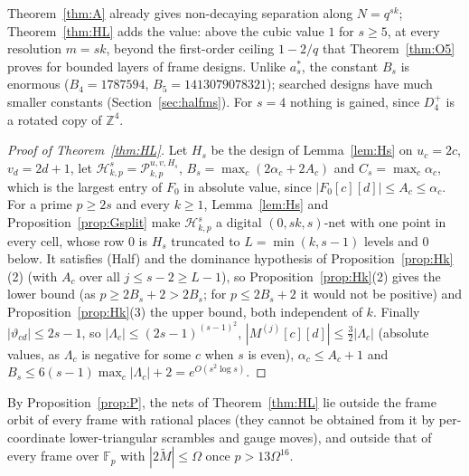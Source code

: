 \documentclass[11pt]{amsart}
\theoremstyle{definition}
\theoremstyle{plain}
\newcommand{\Z}{\mathbb{Z}}
\newcommand{\F}{\mathbb{F}}
\begin{document}
Theorem~\ref{thm:A} already gives non-decaying separation along $N=q^{sk}$; Theorem~\ref{thm:HL} adds the value: above the cubic value $1$ for $s\ge5$, at every resolution $m=sk$, beyond the first-order ceiling $1-2/q$ that Theorem~\ref{thm:O5} proves for bounded layers of frame designs. Unlike $a^*_s$, the constant $B_s$ is enormous ($B_4=1787594$, $B_5=1413079078321$); searched designs have much smaller constants (Section~\ref{sec:halfms}). For $s=4$ nothing is gained, since $D_4^+$ is a rotated copy of $\Z^4$.

\begin{proof}[Proof of Theorem~\ref{thm:HL}]
Let $H_s$ be the design of Lemma~\ref{lem:Hs} on $u_c=2c$, $v_d=2d+1$, let $\mathcal H^s_{k,p}=\mathcal P^{u,v,H_s}_{k,p}$, $B_s=\max_c(2\alpha_c+2A_c)$ and $C_s=\max_c\alpha_c$, which is the largest entry of $F_0$ in absolute value, since $|F_0[c][d]|\le A_c\le\alpha_c$. For a prime $p\ge2s$ and every $k\ge1$, Lemma~\ref{lem:Hs} and Proposition~\ref{prop:Gsplit} make $\mathcal H^s_{k,p}$ a digital $(0,sk,s)$-net with one point in every cell, whose row $0$ is $H_s$ truncated to $L=\min(k,s-1)$ levels and $0$ below. It satisfies (Half) and the dominance hypothesis of Proposition~\ref{prop:Hk}(2) (with $A_c$ over all $j\le s-2\ge L-1$), so Proposition~\ref{prop:Hk}(2) gives the lower bound (as $p\ge2B_s+2>2B_s$; for $p\le2B_s+2$ it would not be positive) and Proposition~\ref{prop:Hk}(3) the upper bound, both independent of $k$. Finally $|\vartheta_{cd}|\le2s-1$, so $|\Lambda_c|\le(2s-1)^{(s-1)^2}$, $|M^{(j)}[c][d]|\le\frac32|\Lambda_c|$ (absolute values, as $\Lambda_c$ is negative for some $c$ when $s$ is even), $\alpha_c\le A_c+1$ and $B_s\le6(s-1)\max_c|\Lambda_c|+2=e^{O(s^2\log s)}$.
\end{proof}

By Proposition~\ref{prop:P}, the nets of Theorem~\ref{thm:HL} lie outside the frame orbit of every frame with rational places (they cannot be obtained from it by per-coordinate lower-triangular scrambles and gauge moves), and outside that of every frame over $\F_p$ with $|2\tilde M|\le\Omega$ once $p>13\Omega^{16}$.
\end{document}

